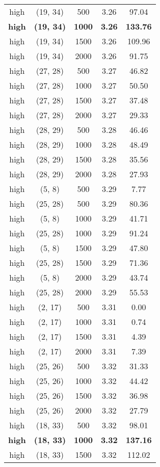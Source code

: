\begin{tabular}{c c c c c}
high & (19, 34) &  500 & 3.26 & 97.04 \\
\textbf{high} & \textbf{(19, 34)} & \textbf{ 1000} & \textbf{3.26} & \textbf{133.76} \\
high & (19, 34) &  1500 & 3.26 & 109.96 \\
high & (19, 34) &  2000 & 3.26 & 91.75 \\
high & (27, 28) &  500 & 3.27 & 46.82 \\
high & (27, 28) &  1000 & 3.27 & 50.50 \\
high & (27, 28) &  1500 & 3.27 & 37.48 \\
high & (27, 28) &  2000 & 3.27 & 29.33 \\
high & (28, 29) &  500 & 3.28 & 46.46 \\
high & (28, 29) &  1000 & 3.28 & 48.49 \\
high & (28, 29) &  1500 & 3.28 & 35.56 \\
high & (28, 29) &  2000 & 3.28 & 27.93 \\
high & (5, 8) &  500 & 3.29 & 7.77 \\
high & (25, 28) &  500 & 3.29 & 80.36 \\
high & (5, 8) &  1000 & 3.29 & 41.71 \\
high & (25, 28) &  1000 & 3.29 & 91.24 \\
high & (5, 8) &  1500 & 3.29 & 47.80 \\
high & (25, 28) &  1500 & 3.29 & 71.36 \\
high & (5, 8) &  2000 & 3.29 & 43.74 \\
high & (25, 28) &  2000 & 3.29 & 55.53 \\
high & (2, 17) &  500 & 3.31 & 0.00 \\
high & (2, 17) &  1000 & 3.31 & 0.74 \\
high & (2, 17) &  1500 & 3.31 & 4.39 \\
high & (2, 17) &  2000 & 3.31 & 7.39 \\
high & (25, 26) &  500 & 3.32 & 31.33 \\
high & (25, 26) &  1000 & 3.32 & 44.42 \\
high & (25, 26) &  1500 & 3.32 & 36.98 \\
high & (25, 26) &  2000 & 3.32 & 27.79 \\
high & (18, 33) &  500 & 3.32 & 98.01 \\
\textbf{high} & \textbf{(18, 33)} & \textbf{ 1000} & \textbf{3.32} & \textbf{137.16} \\
high & (18, 33) &  1500 & 3.32 & 112.02 \\

\end{tabular}
